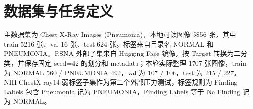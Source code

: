 \chapter{数据集与任务定义}

主数据集为 Chest X-Ray Images (Pneumonia)，本地可读图像 5856 张，其中 train 5216 张、val 16 张、test 624 张。标签来自目录名 NORMAL 和 PNEUMONIA。RSNA 外部子集来自 Hugging Face 镜像，按 Target 转换为二分类，并保存固定 seed=42 的划分和 metadata；本轮实际整理 1707 张图像，train 为 NORMAL 560 / PNEUMONIA 492，val 为 107 / 106，test 为 215 / 227。NIH ChestX-ray14 弱标签子集作为第二个外部压力测试，标签规则为 Finding Labels 包含 Pneumonia 记为 PNEUMONIA，Finding Labels 等于 No Finding 记为 NORMAL。
